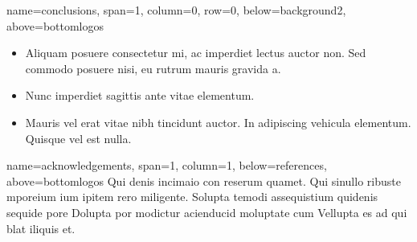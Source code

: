 \documentclass[a0paper,portrait]{baposter}
\newcommand{\acknowledgementsfont}{\small}
\begin{document}
\begin{poster}
{name=conclusions, span=1, column=0, row=0, below=background2,
 above=bottomlogos
 }{
\vspace{0.5mm}

\begin{itemize}
\item Aliquam posuere consectetur mi, ac imperdiet lectus auctor non.
Sed commodo posuere nisi, eu rutrum mauris gravida a.
\item Nunc imperdiet sagittis ante vitae elementum.
\item Mauris vel erat vitae nibh tincidunt auctor. In adipiscing vehicula
elementum. Quisque vel est nulla.
\end{itemize}
}

{name=acknowledgements, span=1, column=1, below=references, 
above=bottomlogos
}{
\acknowledgementsfont
Qui denis incimaio con reserum quamet. Qui sinullo ribuste mporeium ium ipitem rero miligente. Solupta temodi assequistium quidenis sequide pore Dolupta por modictur acienducid moluptate cum Vellupta es ad qui blat iliquis et.
}




\end{poster}
\end{document}

